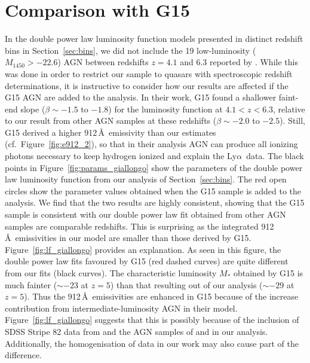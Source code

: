\documentclass[fleqn,usenatbib]{mnras}
\def\lya{Ly$\alpha$~}
\begin{document}
\section{Comparison with G15}
\label{sec:conv}
In the double power law luminosity function models presented in
distinct redshift bins in Section~\ref{sec:bins}, we did not include
the 19 low-luminosity ($M_{1450}>-22.6$) AGN between redshifts $z=4.1$
and $6.3$ reported by \citep[][hereafter G15]{2015AA...578A..83G}.
While this was done in order to restrict our sample to quasars with
spectroscopic redshift determinations, it is instructive to consider
how our results are affected if the G15 AGN are added to the analysis.
In their work, G15 found a shallower faint-end slope ($\beta\sim -1.5$
to $-1.8$) for the luminosity function at $4.1 < z < 6.3$, relative to
our result from other AGN samples at these redshifts ($\beta\sim -2.0$
to $-2.5$).  Still, G15 derived a higher 912\,\AA\ emissivity than our
estimates (cf.\ Figure~\ref{fig:e912_2}), so that in their analysis
AGN can produce all ionizing photons necessary to keep hydrogen
ionized and explain the \lya data.  The black points in
Figure~\ref{fig:params_giallongo} show the parameters of the double
power law luminosity function from our analysis of
Section~\ref{sec:bins}.  The red open circles show the parameter
values obtained when the G15 sample is added to the analysis.  We find
that the two results are highly consistent, showing that the G15
sample is consistent with our double power law fit obtained from other
AGN samples are comparable redshifts.  This is surprising as the
integrated 912\,\AA\ emissivities in our model are smaller than those
derived by G15.  Figure~\ref{fig:lf_giallongo} provides an
explanation.  As seen in this figure, the double power law fits
favoured by G15 (red dashed curves) are quite different from our fits
(black curves).  The characteristic luminosity $M_*$ obtained by G15
is much fainter ($\sim -23$ at $z = 5$) than that resulting out of our
analysis ($\sim -29$ at $z = 5$).  Thus the 912\,\AA\ emissivities are
enhanced in G15 because of the increase contribution from
intermediate-luminosity AGN in their model.
Figure~\ref{fig:lf_giallongo} suggests that this is possibly because
of the inclusion of SDSS Stripe 82 data from
\citet{2013ApJ...768..105M} and the AGN samples of
\citet{2010AJ....139..906W} and \citet{2015ApJ...798...28K} in our
analysis.  Additionally, the homogenisation of data in our work may
also cause part of the difference.
\end{document}
